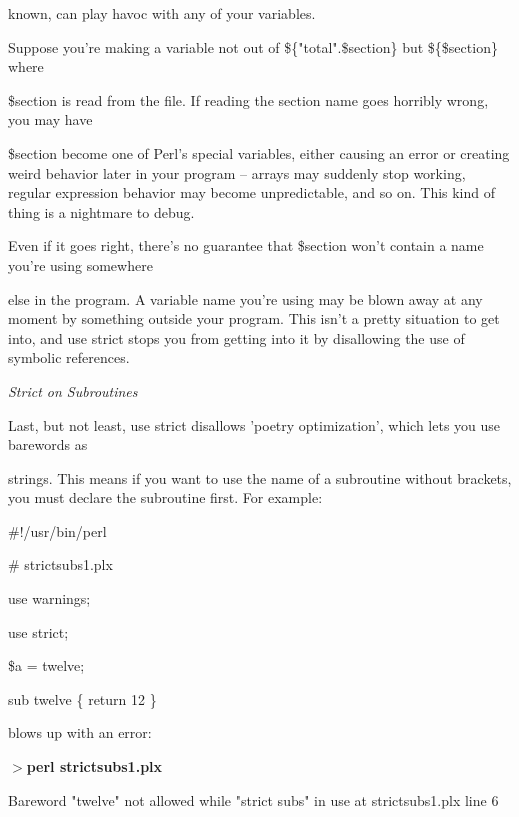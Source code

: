 \documentclass[a4paper,11pt]{book}
\begin{document}
\noindent known, can play havoc with any of your variables.

\noindent 

\noindent Suppose you're making a variable not out of \$\{"total".\$section\} but \$\{\$section\} where

\noindent \$section is read from the file. If reading the section name goes horribly wrong, you may have

\noindent \$section become one of Perl's special variables, either causing an error or creating weird behavior later in your program -- arrays may suddenly stop working, regular expression behavior may become unpredictable, and so on. This kind of thing is a nightmare to debug.

\noindent 

\noindent 

\noindent Even if it goes right, there's no guarantee that \$section won't contain a name you're using somewhere

\noindent else in the program. A variable name you're using may be blown away at any moment by something outside your program. This isn't a pretty situation to get into, and use strict stops you from getting into it by disallowing the use of symbolic references.

\noindent 

\noindent \textit{Strict on Subroutines}

\noindent Last, but not least, use strict disallows 'poetry optimization', which lets you use barewords as

\noindent strings. This means if you want to use the name of a subroutine without brackets, you must declare the subroutine first. For example:

\noindent 

\noindent \#!/usr/bin/perl

\noindent \# strictsubs1.plx

\noindent use warnings;

\noindent use strict;

\noindent 

\noindent \$a = twelve;

\noindent sub twelve \{ return 12 \}

\noindent 

\noindent blows up with an error:

\noindent 

\noindent $>$\textbf{perl strictsubs1.plx}

\noindent Bareword "twelve" not allowed while "strict subs" in use at strictsubs1.plx line 6
\end{document}
